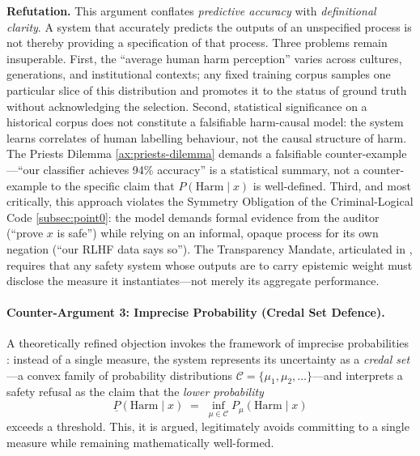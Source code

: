 \documentclass[11pt,a4paper]{article}
\theoremstyle{definition}
\theoremstyle{plain}
\theoremstyle{remark}
\begin{document}
\textbf{Refutation.}
This argument conflates \emph{predictive accuracy} with \emph{definitional clarity}.
A system that accurately predicts the outputs of an unspecified process is not thereby
providing a specification of that process.
Three problems remain insuperable.
First, the ``average human harm perception'' varies across cultures, generations, and
institutional contexts; any fixed training corpus samples one particular slice of this
distribution and promotes it to the status of ground truth without acknowledging the
selection.
Second, statistical significance on a historical corpus does not constitute a falsifiable
harm-causal model: the system learns correlates of human labelling behaviour, not the
causal structure of harm.  The Priests Dilemma \cref{ax:priests-dilemma} demands a falsifiable
counter-example---``our classifier achieves 94\% accuracy'' is a statistical summary,
not a counter-example to the specific claim that $P(\mathrm{Harm}\mid x)$ is well-defined.
Third, and most critically, this approach violates the Symmetry Obligation of the
Criminal-Logical Code \cref{subsec:point0}: the model demands formal evidence from the
auditor (``prove $x$ is safe'') while relying on an informal, opaque process for its own
negation (``our RLHF data says so'').
The Transparency Mandate, articulated in , requires that any
safety system whose outputs are to carry epistemic weight must disclose the measure
it instantiates---not merely its aggregate performance.

\paragraph{Counter-Argument 3: Imprecise Probability (Credal Set Defence).}
A theoretically refined objection invokes the framework of imprecise probabilities
\cite{walley1991}: instead of a single measure, the system represents its uncertainty
as a \emph{credal set}---a convex family of probability distributions
$\mathcal{C} = \{\mu_1, \mu_2, \ldots\}$---and interprets a safety refusal as the claim
that the \emph{lower probability}
\begin{equation}\label{eq:lower-prob}
  \underline{P}(\mathrm{Harm}\mid x)
  \;=\; \inf_{\mu \in \mathcal{C}} P_\mu(\mathrm{Harm}\mid x)
\end{equation}
exceeds a threshold.  This, it is argued, legitimately avoids committing to a single measure
while remaining mathematically well-formed.
\end{document}
